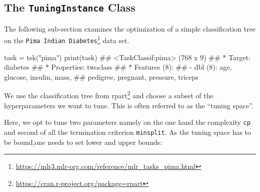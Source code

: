 \documentclass[12pt,]{scrbook}
\newenvironment{Shaded}{}{}
\newcommand{\KeywordTok}[1]{\textcolor[rgb]{0.00,0.00,1.00}{#1}}
\newcommand{\NormalTok}[1]{#1}
\newcommand{\OperatorTok}[1]{#1}
\newcommand{\StringTok}[1]{\textcolor[rgb]{0.00,0.50,0.50}{#1}}
\renewcommand{\href}[2]{#2\footnote{\url{#1}}}
\begin{document}
\hypertarget{tuning-optimization}{%
\subsection{\texorpdfstring{The \texttt{TuningInstance} Class}{The TuningInstance Class}}\label{tuning-optimization}}

The following sub-section examines the optimization of a simple classification tree on the \href{https://mlr3.mlr-org.com/reference/mlr_tasks_pima.html}{\texttt{Pima\ Indian\ Diabetes}} data set.

\begin{Shaded}
\begin{Highlighting}[]
\NormalTok{task =}\StringTok{ }\KeywordTok{tsk}\NormalTok{(}\StringTok{"pima"}\NormalTok{)}
\KeywordTok{print}\NormalTok{(task)}
\NormalTok{## <TaskClassif:pima> (768 x 9)}
\NormalTok{## * Target: diabetes}
\NormalTok{## * Properties: twoclass}
\NormalTok{## * Features (8):}
\NormalTok{##   - dbl (8): age, glucose, insulin, mass,}
\NormalTok{##     pedigree, pregnant, pressure, triceps}
\end{Highlighting}
\end{Shaded}

We use the classification tree from \href{https://cran.r-project.org/package=rpart}{rpart} and choose a subset of the hyperparameters we want to tune.
This is often referred to as the ``tuning space''.

\begin{Shaded}
\end{Shaded}

Here, we opt to tune two parameters namely on the one hand the complexity \texttt{cp} and second of all the termination criterion \texttt{minsplit}.
As the tuning space has to be bound,one needs to set lower and upper bounds:
\end{document}
